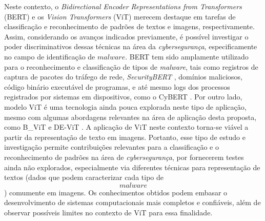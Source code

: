    Neste contexto, o \textit{Bidirectional Encoder Representations from Transformers} (BERT) e os \textit{Vision Transformers} (ViT) merecem destaque em tarefas de classificação e reconhecimento de padrões de textos e imagens, respectivamente. Assim, considerando os avanços indicados previamente, é possível investigar o poder discriminativos dessas técnicas na área da \textit{cybersegurança}, especificamente no campo de identificação de $malware$. BERT tem sido amplamente utilizado para o reconhecimento e classificação de tipos de \textit{malware}, tais como registros de captura de pacotes do tráfego de rede, \textit{SecurityBERT} \cite{ferrag2024revolutionizing}, domínios maliciosos, código binário executável de programas, e até mesmo logs dos processos registrados por sistemas em dispositivos, como o CyBERT \cite{ranade2021cybert}. Por outro lado, modelo ViT é uma tecnologia ainda pouca explorada neste tipo de aplicação, mesmo com algumas abordagens relevantes na área de aplicação desta proposta, como B\_ViT \cite{belal2023global} e DE-ViT \cite{he2024network}. A aplicação de ViT neste contexto torna-se viável a partir da representação de texto em imagens. Portanto, esse tipo de estudo e investigação permite contribuições relevantes para a classificação e o reconhecimento de padrões na área de \textit{cybersegurança}, por fornecerem testes ainda não explorados, especialmente via diferentes técnicas para representação de textos (dados que podem caracterizar cada tipo de $$malware$$) comumente  em imagens. Os conhecimentos obtidos podem embasar o desenvolvimento de sistemas computacionais mais completos e confiáveis, além de observar possíveis limites no contexto de ViT para essa finalidade.
